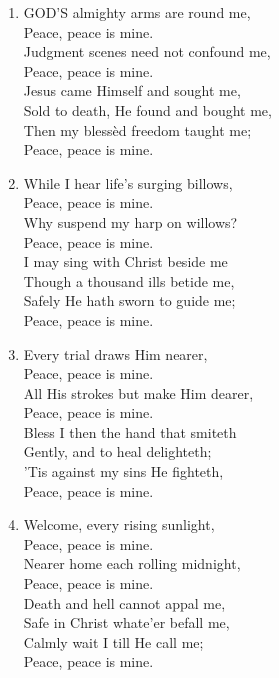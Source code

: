 \documentclass[11pt,a4paper]{article}
\begin{document}
\begin{enumerate}
    \item GOD'S almighty arms are round me, \\
        Peace, peace is mine. \\
        Judgment scenes need not confound me, \\
        Peace, peace is mine. \\
        Jesus came Himself and sought me, \\
        Sold to death, He found and bought me, \\
        Then my bless\`ed freedom taught me; \\
        Peace, peace is mine.

    \item While I hear life's surging billows, \\
        Peace, peace is mine. \\
        Why suspend my harp on willows? \\
        Peace, peace is mine. \\
        I may sing with Christ beside me \\
        Though a thousand ills betide me, \\
        Safely He hath sworn to guide me; \\
        Peace, peace is mine.

    \item Every trial draws Him nearer, \\
        Peace, peace is mine. \\
        All His strokes but make Him dearer, \\
        Peace, peace is mine. \\
        Bless I then the hand that smiteth \\
        Gently, and to heal delighteth; \\
        'Tis against my sins He fighteth, \\
        Peace, peace is mine.

    \item Welcome, every rising sunlight, \\
        Peace, peace is mine. \\
        Nearer home each rolling midnight, \\
        Peace, peace is mine. \\
        Death and hell cannot appal me, \\
        Safe in Christ whate'er befall me, \\
        Calmly wait I till He call me; \\
        Peace, peace is mine.

\end{enumerate}
\end{document}
